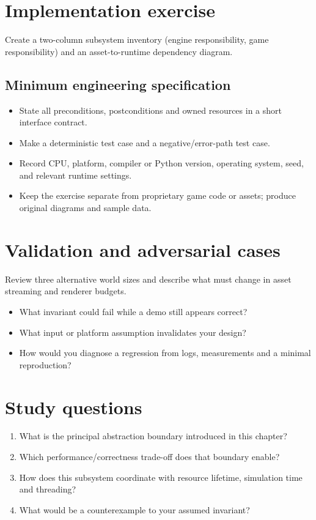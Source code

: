 \documentclass[11pt,letterpaper]{article}
\begin{document}
\section{Implementation exercise}
Create a two-column subsystem inventory (engine responsibility, game responsibility) and an asset-to-runtime dependency diagram.

\subsection{Minimum engineering specification}
\begin{itemize}
\item State all preconditions, postconditions and owned resources in a short interface contract.
\item Make a deterministic test case and a negative/error-path test case.
\item Record CPU, platform, compiler or Python version, operating system, seed, and relevant runtime settings.
\item Keep the exercise separate from proprietary game code or assets; produce original diagrams and sample data.
\end{itemize}
\section{Validation and adversarial cases}
Review three alternative world sizes and describe what must change in asset streaming and renderer budgets.

\begin{itemize}
\item What invariant could fail while a demo still appears correct?
\item What input or platform assumption invalidates your design?
\item How would you diagnose a regression from logs, measurements and a minimal reproduction?
\end{itemize}
\section{Study questions}
\begin{enumerate}
\item What is the principal abstraction boundary introduced in this chapter?
\item Which performance/correctness trade-off does that boundary enable?
\item How does this subsystem coordinate with resource lifetime, simulation time and threading?
\item What would be a counterexample to your assumed invariant?
\end{enumerate}
\end{document}
